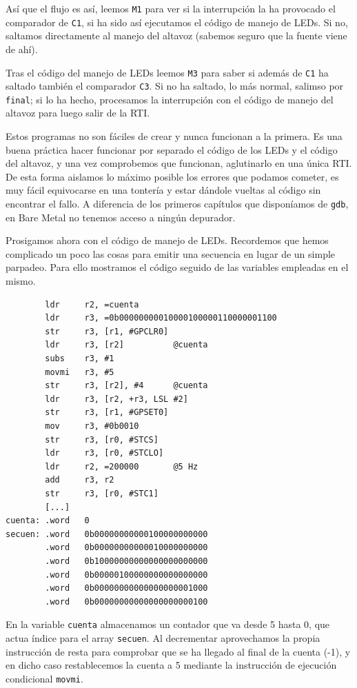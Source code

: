 Así que el flujo es así, leemos {\tt M1} para ver si la interrupción la ha provocado el
comparador de {\tt C1}, si ha sido así ejecutamos el código de manejo de LEDs. Si no,
saltamos directamente al manejo del altavoz (sabemos seguro que la fuente viene de ahí).

Tras el código del manejo de LEDs leemos {\tt M3} para saber si además de {\tt C1} ha
saltado también el comparador {\tt C3}. Si no ha saltado, lo más normal, salimso por
{\tt final}; si lo ha hecho, procesamos la interrupción con el código de manejo del altavoz
para luego salir de la RTI.

Estos programas no son fáciles de crear y nunca funcionan a la primera. Es una buena práctica
hacer funcionar por separado el código de los LEDs y el código del altavoz, y una vez
comprobemos que funcionan, aglutinarlo en una única RTI. De esta forma aislamos lo máximo
posible los errores que podamos cometer, es muy fácil equivocarse en una tontería y estar
dándole vueltas al código sin encontrar el fallo. A diferencia de los primeros capítulos
que disponíamos de {\tt gdb}, en Bare Metal no tenemos acceso a ningún depurador.

Prosigamos ahora con el código de manejo de LEDs. Recordemos que hemos complicado un poco
las cosas para emitir una secuencia en lugar de un simple parpadeo. Para ello mostramos
el código seguido de las variables empleadas en el mismo.

\begin{lstlisting}
        ldr     r2, =cuenta
        ldr     r3, =0b00000000010000100000110000001100
        str     r3, [r1, #GPCLR0]
        ldr     r3, [r2]          @cuenta
        subs    r3, #1
        movmi   r3, #5
        str     r3, [r2], #4      @cuenta
        ldr     r3, [r2, +r3, LSL #2]
        str     r3, [r1, #GPSET0]
        mov     r3, #0b0010
        str     r3, [r0, #STCS]
        ldr     r3, [r0, #STCLO]
        ldr     r2, =200000       @5 Hz
        add     r3, r2
        str     r3, [r0, #STC1]
        [...]
cuenta: .word   0
secuen: .word   0b00000000000100000000000
        .word   0b00000000000010000000000
        .word   0b10000000000000000000000
        .word   0b00000100000000000000000
        .word   0b00000000000000000001000
        .word   0b00000000000000000000100
\end{lstlisting}

En la variable {\tt cuenta} almacenamos un contador que va desde 5 hasta 0, que actua
índice para el array {\tt secuen}. Al decrementar aprovechamos la propia instrucción de
resta para comprobar que se ha llegado al final de la cuenta (-1), y en dicho caso
restablecemos la cuenta a 5 mediante la instrucción de ejecución condicional {\tt movmi}.

